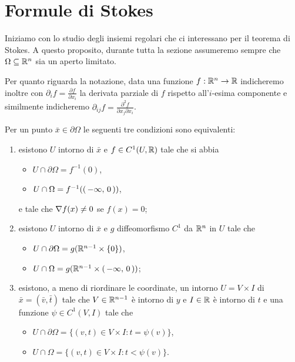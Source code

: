 \section{Formule di Stokes}\label{sezione:FormuleStokes}

Iniziamo con lo studio degli insiemi regolari che ci interessano per il teorema di Stokes.
A questo proposito, durante tutta la sezione assumeremo sempre che $\Omega\subseteq\mathbb R^n$ sia un aperto limitato.

Per quanto riguarda la notazione, data una funzione $f:\mathbb R^n\to \mathbb R$ indicheremo inoltre con $\partial_i f=\frac{\partial f}{\partial x_i}$ la derivata parziale di $f$ rispetto all'$i$-esima componente e similmente indicheremo $\partial_{ij}f=\frac{\partial^2 f}{\partial x_j\partial x_i}$. 

\begin{theorem}\label{thm:PtRegEquiv}
	Per un punto $\bar x\in \partial \Omega$ le seguenti tre condizioni sono equivalenti:
	\begin{enumerate}
		\item esistono $U$ intorno di $\bar x$ e $f\in C^1(U,\mathbb R)$ tale che si abbia
			\begin{itemize}
				\item $U\cap \partial \Omega=f^{-1}(0)$,
				\item $U\cap \Omega=f^{-1}(\left(\,-\infty,\,0\,\right))$,
			\end{itemize}
			e tale che $\nabla f(x)\neq 0$ se $f(x)=0$;\label{PRE:i}
		\item esistono $U$ intorno di $\bar x$ e $g$ diffeomorfismo $C^1$ da $\mathbb R^n$ in $U$ tale che\label{PRE:ii}
			\begin{itemize}
				\item $U\cap \partial \Omega = g(\mathbb R^{n-1}\times\{0\})$,
				\item $U\cap \Omega = g(\mathbb R^{n-1}\times\left(\,-\infty,\,0\,\right))$;
			\end{itemize}
		\item esistono, a meno di riordinare le coordinate, un intorno $U=V\times I$ di $\bar x=(\bar v,\bar t)$ tale che $V\in\mathbb R^{n-1}$ è intorno di $y$
			e $I\in\mathbb R$ è intorno di $t$ e una funzione $\psi\in C^1(V,I)$ tale che
			\begin{itemize}
				\item $U\cap \partial \Omega = \{(v,t)\in V\times I: t=\psi(v)\}$,
				\item $U\cap \Omega = \{(v,t)\in V\times I:t<\psi(v)\}$.
			\end{itemize}\label{PRE:iii}
	\end{enumerate}
\end{theorem}

